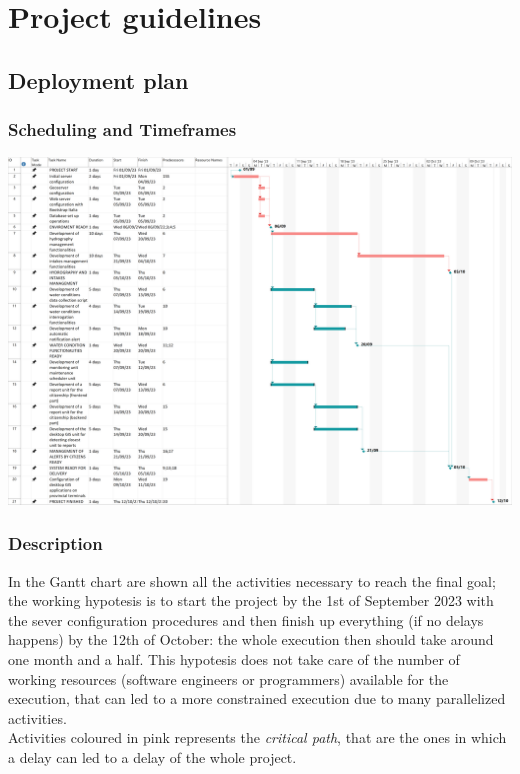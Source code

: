 \section{Project guidelines}
\subsection{Deployment plan}
\subsubsection{Scheduling and Timeframes}
   
\begin{center}
    \includegraphics[width=\textwidth]{img/gantt.png}
\end{center}

\subsubsection{Description}
In the Gantt chart are shown all the activities necessary to reach the final goal; the working hypotesis is to start the project by the 1st of September 2023 with the sever configuration procedures and then finish up everything (if no delays happens) by the 12th of October: the whole execution then should take around one month and a half.
This hypotesis does not take care of the number of working resources (software engineers or programmers) available for the execution, that can led to a more constrained execution due to many parallelized activities. \\
Activities coloured in pink represents the \textit{critical path}, that are the ones in which a delay can led to a delay of the whole project.

